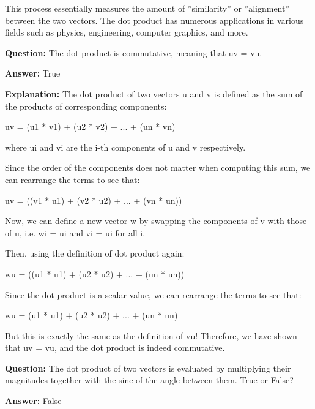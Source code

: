 \documentclass{article}
\begin{document}
This process essentially measures the amount of ''similarity'' or ''alignment'' between the two vectors. The dot product has numerous applications in various fields such as physics, engineering, computer graphics, and more.
                
                \vspace{0.5cm} 
        
            
                \textbf {Question:} The dot product is commutative, meaning that u{\textperiodcentered}v = v{\textperiodcentered}u.
                
                \textbf{Answer:} True

                \textbf{Explanation:} The dot product of two vectors u and v is defined as the sum of the products of corresponding components:

u{\textperiodcentered}v = (u1 * v1) + (u2 * v2) + ... + (un * vn)

where ui and vi are the i-th components of u and v respectively.

Since the order of the components does not matter when computing this sum, we can rearrange the terms to see that:

u{\textperiodcentered}v = ((v1 * u1) + (v2 * u2) + ... + (vn * un))

Now, we can define a new vector w by swapping the components of v with those of u, i.e. wi = ui and vi = ui for all i.

Then, using the definition of dot product again:

w{\textperiodcentered}u = ((u1 * u1) + (u2 * u2) + ... + (un * un))

Since the dot product is a scalar value, we can rearrange the terms to see that:

w{\textperiodcentered}u = (u1 * u1) + (u2 * u2) + ... + (un * un)

But this is exactly the same as the definition of v{\textperiodcentered}u! Therefore, we have shown that u{\textperiodcentered}v = v{\textperiodcentered}u, and the dot product is indeed commutative.
                
                \vspace{0.5cm} 
        
            
                \textbf {Question:} The dot product of two vectors is evaluated by multiplying their magnitudes together with the sine of the angle between them. True or False?
                
                \textbf{Answer:} False
\end{document}
